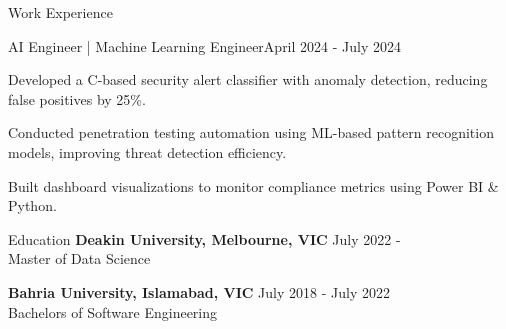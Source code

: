 \documentclass{resume} %
\begin{document}
    \begin{rSection}{Work Experience}
                    \begin{rSubsection}
                {AI Engineer | Machine Learning Engineer}{April 2024 - July 2024}
                                    {}
                                {}
                                    \item Developed a C{-}based security alert classifier with anomaly detection, reducing false positives by 25\%.
                                    \item Conducted penetration testing automation using ML{-}based pattern recognition models, improving threat detection efficiency.
                                    \item Built dashboard visualizations to monitor compliance metrics using Power BI \& Python.
                            \end{rSubsection}
            \end{rSection}

\begin{rSection}{Education}
                        \textbf{Deakin University, Melbourne, VIC} \hfill {July 2022 - } \\
                            {Master of Data Science}
                         
             
         
                        \textbf{Bahria University, Islamabad, VIC} \hfill {July 2018 - July 2022} \\
                            {Bachelors of Software Engineering}
                         
             
         
    \end{rSection}
\end{document}
